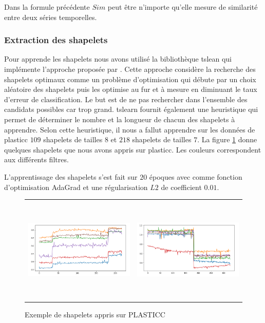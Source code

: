 Dans la formule précédente $ Sim $ peut être n'importe qu'elle mesure de similarité entre deux séries temporelles. 

\subsubsection{Extraction des shapelets}
Pour apprende les shapelets nous avons utilisé la bibliothèque tslean\citep{tslearn} qui implémente l'approche proposée par \citet{grabocka2014learning}. Cette approche considère la recherche des shapelets optimaux comme un problème d'optimisation qui débute par un choix aléatoire des shapelets puis les optimise au fur et à mesure en diminuant le taux d'erreur de classification. Le but est de ne pas rechercher dans l'ensemble des candidats possibles car trop grand. tslearn fournit également une heuristique qui permet de déterminer le nombre et la longueur de chacun des shapelets à apprendre. Selon cette heuristique, il nous a fallut apprendre sur les données de plasticc $ 109 $ shapelets de tailles $ 8 $ et $ 218 $ shapelets de tailles $ 7 $. La figure \ref{fig:shapelet_example} donne quelques shapelets que nous avons appris sur plasticc. Les couleurs correspondent aux différents filtres.

L'apprentissage des shapelets s'est fait sur $ 20 $ époques avec comme fonction d'optimisation AdaGrad\cite{duchi2011adaptive} et une régularisation $L2$ de coefficient $ 0.01 $. 

\begin{figure}[!h]
    \centering
    \begin{tabular}{c|c}
         \includegraphics[width=7cm,height=5cm]{report/figures/shapelet.png} & \includegraphics[width=7cm,height=5cm]{report/figures/shapelet2.png}
    \end{tabular}
    \caption{Exemple de shapelets appris sur PLASTICC}
    \label{fig:shapelet_example}
\end{figure}

